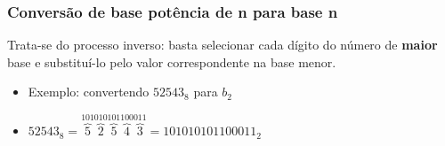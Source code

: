 \documentclass[12pt]{article}
\begin{document}
\subsubsection{Conversão de base potência de n para base n}
Trata-se do processo inverso: basta selecionar cada dígito do número de \textbf{maior} base e substituí-lo pelo valor correspondente na base menor.

\begin{itemize}
    \item Exemplo: convertendo $52543_{8}$ para $b_{2}$
    \item [""] $52543_{8} = \overset{101}{\overbrace{5}}\overset{010}{\overbrace{2}}\overset{101}{\overbrace{5}}\overset{100}{\overbrace{4}}\overset{011}{\overbrace{3}} = 101010101100011_{2}$
\end{itemize}
\end{document}
